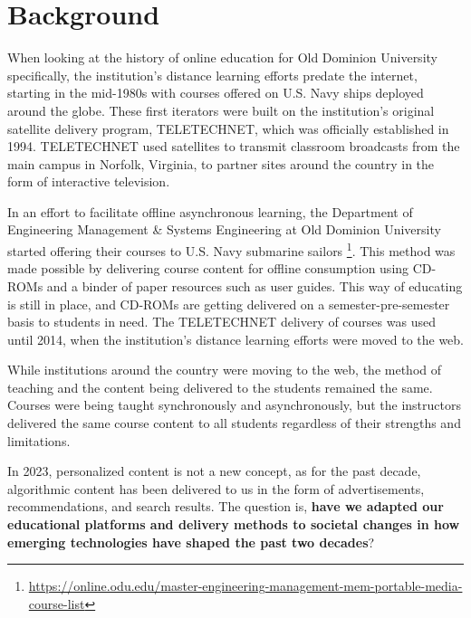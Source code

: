 \chapter{Background}
\label{ch:background}

When looking at the history of online education for Old Dominion University specifically, the institution's distance learning efforts predate the internet, starting in the mid-1980s\cite{oduglobal:history} with courses offered on U.S. Navy ships deployed around the globe. These first iterators were built on the institution's original satellite delivery program, TELETECHNET\cite{585174}, which was officially established in 1994. TELETECHNET used satellites to transmit classroom broadcasts from the main campus in Norfolk, Virginia, to partner sites around the country in the form of interactive television. 

In an effort to facilitate offline asynchronous learning, the Department of Engineering Management \& Systems Engineering at Old Dominion University started offering their courses to U.S. Navy submarine sailors
\footnote{\url{https://online.odu.edu/master-engineering-management-mem-portable-media-course-list}}. This method was made possible by delivering course content for offline consumption using CD-ROMs and a binder of paper resources such as user guides. This way of educating is still in place, and CD-ROMs are getting delivered on a semester-pre-semester basis to students in need. The TELETECHNET delivery of courses was used until 2014, when the institution's distance learning efforts were moved to the web. 

While institutions around the country were moving to the web, the method of teaching and the content being delivered to the students remained the same. Courses were being taught synchronously and asynchronously, but the instructors delivered the same course content to all students regardless of their strengths and limitations. 

In 2023, personalized content is not a new concept, as for the past decade, algorithmic content has been delivered to us in the form of advertisements, recommendations, and search results. The question is, \textbf{have we adapted our educational platforms and delivery methods to societal changes in how emerging technologies have shaped the past two decades}?